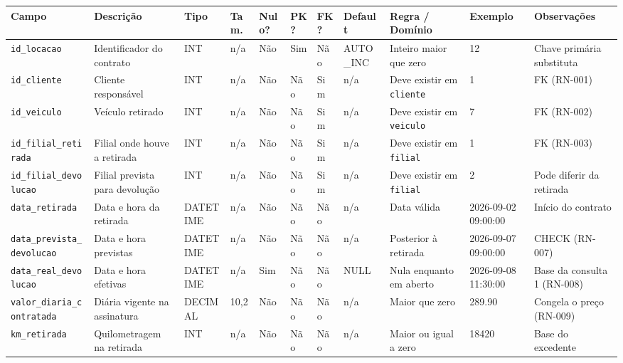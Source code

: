 \begin{table}[!t]
\begin{tabular}{|L{2.15cm}|L{2.7cm}|L{1.15cm}|C{0.62cm}|C{0.62cm}|C{0.5cm}|C{0.5cm}|L{1.45cm}|L{2.6cm}|L{2.0cm}|L{1.85cm}|}
\hline
\textbf{Campo} & \textbf{Descri\c{c}\~ao} & \textbf{Tipo} & \textbf{Tam.} & \textbf{Nulo?} & \textbf{PK?} & \textbf{FK?} & \textbf{Default} & \textbf{Regra / Dom\'inio} & \textbf{Exemplo} & \textbf{Observa\c{c}\~oes} \\
\hline
\texttt{id\_\allowbreak{}locacao} & Identificador do contrato & INT & n/a & N\~ao & Sim & N\~ao & AUTO\_\allowbreak{}INC & Inteiro maior que zero & 12 & Chave prim\'aria substituta \\
\hline
\texttt{id\_\allowbreak{}cliente} & Cliente respons\'avel & INT & n/a & N\~ao & N\~ao & Sim & n/a & Deve existir em \texttt{cliente} & 1 & FK (RN-001) \\
\hline
\texttt{id\_\allowbreak{}veiculo} & Ve\'iculo retirado & INT & n/a & N\~ao & N\~ao & Sim & n/a & Deve existir em \texttt{veiculo} & 7 & FK (RN-002) \\
\hline
\texttt{id\_\allowbreak{}filial\_\allowbreak{}retirada} & Filial onde houve a retirada & INT & n/a & N\~ao & N\~ao & Sim & n/a & Deve existir em \texttt{filial} & 1 & FK (RN-003) \\
\hline
\texttt{id\_\allowbreak{}filial\_\allowbreak{}devolucao} & Filial prevista para devolu\c{c}\~ao & INT & n/a & N\~ao & N\~ao & Sim & n/a & Deve existir em \texttt{filial} & 2 & Pode diferir da retirada \\
\hline
\texttt{data\_\allowbreak{}retirada} & Data e hora da retirada & DATETIME & n/a & N\~ao & N\~ao & N\~ao & n/a & Data v\'alida & 2026-09-02 09:00:00 & In\'icio do contrato \\
\hline
\texttt{data\_\allowbreak{}prevista\_\allowbreak{}devolucao} & Data e hora previstas & DATETIME & n/a & N\~ao & N\~ao & N\~ao & n/a & Posterior \`a retirada & 2026-09-07 09:00:00 & CHECK (RN-007) \\
\hline
\texttt{data\_\allowbreak{}real\_\allowbreak{}devolucao} & Data e hora efetivas & DATETIME & n/a & Sim & N\~ao & N\~ao & NULL & Nula enquanto em aberto & 2026-09-08 11:30:00 & Base da consulta 1 (RN-008) \\
\hline
\texttt{valor\_\allowbreak{}diaria\_\allowbreak{}contratada} & Di\'aria vigente na assinatura & DECIMAL & 10,2 & N\~ao & N\~ao & N\~ao & n/a & Maior que zero & 289.90 & Congela o pre\c{c}o (RN-009) \\
\hline
\texttt{km\_\allowbreak{}retirada} & Quilometragem na retirada & INT & n/a & N\~ao & N\~ao & N\~ao & n/a & Maior ou igual a zero & 18420 & Base do excedente \\

\end{tabular}
\end{table}
